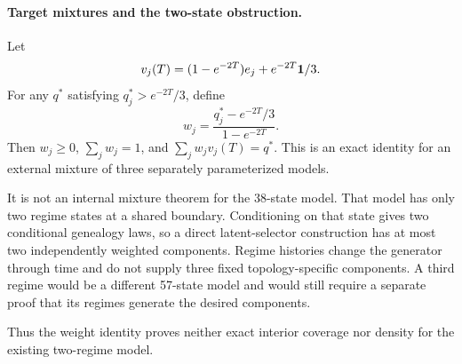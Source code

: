 \paragraph{Target mixtures and the two-state obstruction.}
Let
\[
v_j(T)=(1-e^{-2T})e_j+e^{-2T}{\bf1}/3.
\]
For any $q^*$ satisfying $q^*_j>e^{-2T}/3$, define
\[
w_j=\frac{q^*_j-e^{-2T}/3}{1-e^{-2T}}.
\]
Then $w_j\geq0$, $\sum_jw_j=1$, and
$\sum_jw_jv_j(T)=q^*$. This is an exact identity for an external mixture of
three separately parameterized models.

It is not an internal mixture theorem for the 38-state model. That model has
only two regime states at a shared boundary. Conditioning on that state gives
two conditional genealogy laws, so a direct latent-selector construction has at
most two independently weighted components. Regime histories change the
generator through time and do not supply three fixed topology-specific
components. A third regime would be a different 57-state model and would still
require a separate proof that its regimes generate the desired components.

Thus the weight identity proves neither exact interior coverage nor density for
the existing two-regime model.
